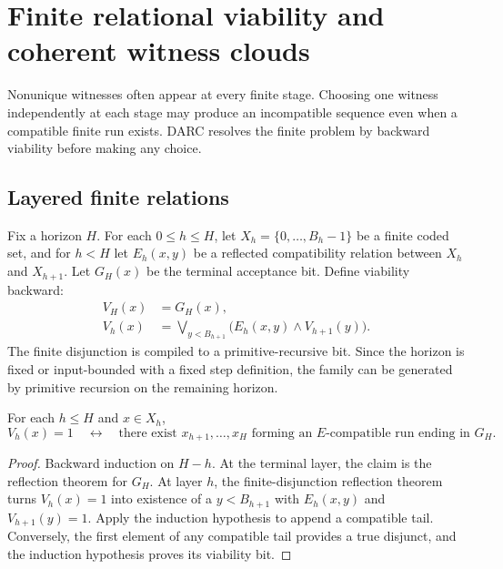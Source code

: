 \section{Finite relational viability and coherent witness clouds}
\label{sec:relations}

Nonunique witnesses often appear at every finite stage.  Choosing one witness
independently at each stage may produce an incompatible sequence even when a
compatible finite run exists.  DARC resolves the finite problem by backward
viability before making any choice.

\subsection{Layered finite relations}

Fix a horizon \(H\).  For each \(0\le h\le H\), let
\(X_h=\{0,\ldots,B_h-1\}\) be a finite coded set, and for
\(h<H\) let \(E_h(x,y)\) be a reflected compatibility relation between
\(X_h\) and \(X_{h+1}\).  Let \(G_H(x)\) be the terminal acceptance bit.
Define viability backward:
\begin{align*}
  V_H(x)&=G_H(x),\\
  V_h(x)&=\bigvee_{y<B_{h+1}}
      \bigl(E_h(x,y)\wedge V_{h+1}(y)\bigr).
  \tag{11.1}\label{eq:viability}
\end{align*}
The finite disjunction is compiled to a primitive-recursive bit.  Since the
horizon is fixed or input-bounded with a fixed step definition, the family can
be generated by primitive recursion on the remaining horizon.

\begin{theorem}
\label{thm:finite-viability}
For each \(h\le H\) and \(x\in X_h\),
\[
  V_h(x)=1
  \quad\leftrightarrow\quad
  \text{there exist }x_{h+1},\ldots,x_H
  \text{ forming an }E\text{-compatible run ending in }G_H.
\]
\end{theorem}

\begin{proof}
Backward induction on \(H-h\).  At the terminal layer, the claim is the
reflection theorem for \(G_H\).  At layer \(h\), the finite-disjunction
reflection theorem turns \(V_h(x)=1\) into existence of a
\(y<B_{h+1}\) with \(E_h(x,y)\) and \(V_{h+1}(y)=1\).  Apply the induction
hypothesis to append a compatible tail.  Conversely, the first element of any
compatible tail provides a true disjunct, and the induction hypothesis proves
its viability bit.
\end{proof}


